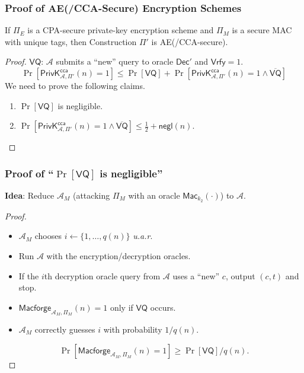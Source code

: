 \begin{frame}\frametitle{Proof of AE(/CCA-Secure) Encryption Schemes}
\begin{theorem}
If $\Pi_E$ is a CPA-secure private-key encryption scheme and $\Pi_M$ is a secure MAC with unique tags, then Construction $\Pi'$ is AE(/CCA-secure).
\end{theorem}
\begin{proof}
$\mathsf{VQ}$: $\mathcal{A}$ submits a ``new'' query to oracle $\mathsf{Dec}'$ and $\mathsf{Vrfy}=1$.
\[ \Pr[\mathsf{PrivK}^{\mathsf{cca}}_{\mathcal{A},\Pi'}(n)=1] \le \Pr[\mathsf{VQ}] + \Pr[\mathsf{PrivK}^{\mathsf{cca}}_{\mathcal{A},\Pi'}(n)=1 \land \overline{\mathsf{VQ}}] \]
We need to prove the following claims.
\begin{enumerate}
\item $\Pr[\mathsf{VQ}]$ is negligible.
\item $\Pr[\mathsf{PrivK}^{\mathsf{cca}}_{\mathcal{A},\Pi'}(n)=1 \land \overline{\mathsf{VQ}}] \le \frac{1}{2} + \mathsf{negl}(n)$. 
\end{enumerate}
\end{proof}
\end{frame}
\begin{frame}\frametitle{Proof of ``$\Pr[\mathsf{VQ}]$ is negligible''}
\textbf{Idea}: Reduce $\mathcal{A}_M$ (attacking $\Pi_M$ with an oracle $\mathsf{Mac}_{k_2}(\cdot)$) to $\mathcal{A}$.
\begin{proof}
\begin{itemize}
\item $\mathcal{A}_M$ chooses $i \gets \{1,\dotsc,q(n)\}$ \emph{u.a.r}.
\item Run $\mathcal{A}$ with the encryption/decryption oracles.
\item If the $i$th decryption oracle query from $\mathcal{A}$ uses a ``new'' $c$, output $(c,t)$ and stop.
\item $\mathsf{Macforge}_{\mathcal{A}_M,\Pi_M }(n)=1$ only if $\mathsf{VQ}$ occurs.
\item $\mathcal{A}_M$ correctly guesses $i$ with probability $1/q(n)$.
\end{itemize}
\[ \Pr [\mathsf{Macforge}_{\mathcal{A}_M,\Pi_M }(n)=1] \ge \Pr[\mathsf{VQ}]/q(n).
\]
\end{proof}
\end{frame}

